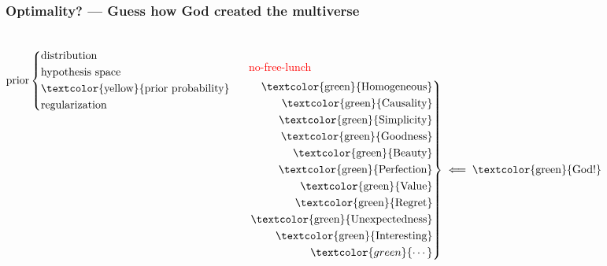 \documentclass[UTF8,11pt,colorlinks,compress,openany]{beamer}%
\begin{document}
\begin{frame}\frametitle{Optimality? --- Guess how God created the multiverse}
	\begin{columns}
			\[\text{prior}\left\{\begin{aligned}
			&\text{distribution}\\
			&\text{hypothesis space}\\
			&\text{\textcolor{yellow}{prior probability}}\\
			&\text{regularization}
			\end{aligned}\right.\]
			
			\centering{\textcolor{red}{No learning without prior!}}\\
			\textcolor{red}{no-free-lunch}
			\[\left.
			\begin{aligned}
			\text{\textcolor{green}{Homogeneous}}\\
			\text{\textcolor{green}{Causality}}\\
			\text{\textcolor{green}{Simplicity}}\\
			\text{\textcolor{green}{Goodness}}\\
			\text{\textcolor{green}{Beauty}}\\
			\text{\textcolor{green}{Perfection}}\\
			\text{\textcolor{green}{Value}}\\
			\text{\textcolor{green}{Regret}}\\
			\text{\textcolor{green}{Unexpectedness}}\\
			\text{\textcolor{green}{Interesting}}\\
			\textcolor{green}{\cdots}
			\end{aligned}
			\right\rbrace\impliedby\text{\textcolor{green}{God!}}
			\]
	\end{columns}
\end{frame}
\end{document}
